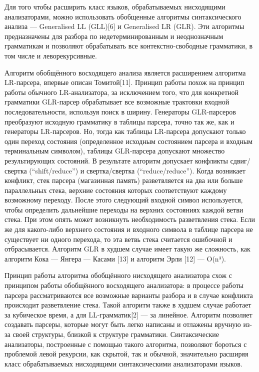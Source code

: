 \documentclass{matmex-diploma-custom}
\begin{document}
Для того чтобы расширить класс языков, обрабатываемых нисходящими анализаторами, можно использовать обобщенные алгоритмы синтаксического анализа — Generalised LL (GLL)[6] и Generalised LR (GLR). Эти алгоритмы предназначены для разбора по недетерминированным и неоднозначным грамматикам и позволяют обрабатывать все контекстно-свободные грамматики, в том числе и леворекурсивные. 

Алгоритм обобщённого восходящего анализа является расширением алгоритма LR-парсера, впервые описан Томитой[11]. Принцип работы похож на принцип работы обычного LR-анализатора, за исключением того, что для конкретной грамматики GLR-парсер обрабатывает все возможные трактовки входной последовательности, используя поиск в ширину. Генераторы GLR-парсеров преобразуют исходную грамматику в таблицы парсера, точно так же, как и генераторы LR-парсеров. Но, тогда как таблицы LR-парсера допускают только один переход состояния (определенное исходным состоянием парсера и входным терминальным символом), таблицы GLR-парсера допускают множество результирующих состояний. В результате алгоритм допускает конфликты сдвиг/свертка (“shift/reduce”) и свертка/свертка (“reduce/reduce”). Когда возникает конфликт, стек парсера (магазинная память) разветвляется на два или больше параллельных стека, верхние состояния которых соответствуют каждому возможному переходу. После этого следующий входной символ используется, чтобы определить дальнейшие переходы на верхних состояниях каждой ветви стека. При этом опять может возникнуть необходимость разветвления стека. Если же для какого-либо верхнего состояния и входного символа в таблице парсера не существует ни одного перехода, то эта ветвь стека считается ошибочной и отбрасывается. Алгоритм GLR в худшем случае имеет такую же сложность, как алгоритм Кока — Янгера — Касами [13] и алгоритм Эрли [12] — O(n³).

Принцип работы алгоритма обобщённого нисходящего анализатора схож с принципом работы обобщённого восходящего анализатора: в процессе работы парсера рассматриваются все возможные варианты разбора и в случае конфликта происходит разветвление стека. Такой алгоритм также в худшем случае работает за кубическое время, а для LL-грамматик[2] — за линейное. Алгоритм позволяет создавать парсеры, которые могут быть легко написаны и отлажены вручную из-за своей структуры, близкой к структуре грамматики. Синтаксические анализаторы, построенные с помощью такого алгоритма, позволяют бороться с проблемой левой рекурсии, как скрытой, так и обычной, значительно расширяя класс обрабатываемых нисходящими синтаксическими анализаторами языков.
\end{document}
